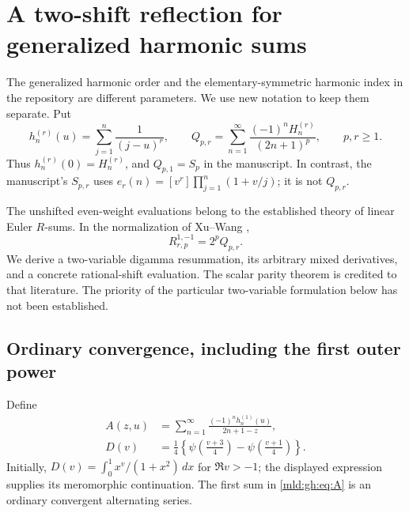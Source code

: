 \section{A two-shift reflection for generalized harmonic sums}
\label{mld:gh:sec:reflection}\label{mld:sec:harmonic}

The generalized harmonic order and the elementary-symmetric harmonic index
in the repository are different parameters. We use new notation to keep
them separate. Put
\[
 h_n^{(r)}(u)=\sum_{j=1}^n\frac1{(j-u)^r},\qquad
 Q_{p,r}=\sum_{n=1}^{\infty}\frac{(-1)^nH_n^{(r)}}{(2n+1)^p},
 \qquad p,r\geq1.
\]
Thus $h_n^{(r)}(0)=H_n^{(r)}$, and $Q_{p,1}=S_p$ in the manuscript.
In contrast, the manuscript's $S_{p,r}$ uses
$e_r(n)=[v^r]\prod_{j=1}^n(1+v/j)$; it is not $Q_{p,r}$.

The unshifted even-weight evaluations belong to the established theory
of linear Euler $R$-sums. In the normalization of Xu--Wang
\cite[Section~3.4, equation~(20)]{XuWang},
\begin{equation}\label{mld:gh:eq:normalization}
 R_{r,p}^{1,-1}=2^p Q_{p,r}.
\end{equation}
We derive a two-variable digamma resummation, its arbitrary mixed
derivatives, and a concrete rational-shift evaluation. The scalar parity
theorem is credited to that literature. The priority of the particular
two-variable formulation below has not been established.

\subsection{Ordinary convergence, including the first outer power}

Define
\begin{align}
 A(z,u)&=\sum_{n=1}^{\infty}
       \frac{(-1)^n h_n^{(1)}(u)}{2n+1-z},\label{mld:gh:eq:A}\\
 D(v)&=\frac14\left\{
       \psi\left(\frac{v+3}{4}\right)
       -\psi\left(\frac{v+1}{4}\right)\right\}.
       \label{mld:gh:eq:D}
\end{align}
Initially, $D(v)=\int_0^1x^v/(1+x^2)\,dx$ for $\Re v>-1$;
the displayed expression supplies its meromorphic continuation.
The first sum in \eqref{mld:gh:eq:A} is an ordinary convergent alternating
series.

